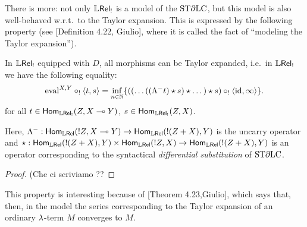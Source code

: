 There is more: not only $\mathbb{L} \mathsf{Rel}_!$ is a model of the $\mathrm{ST}\partial\mathrm{LC}$, but this model is also well-behaved w.r.t.\ to the \lamcalc Taylor expansion.
This is expressed by the following property (see [Definition 4.22, Giulio], where it is called the fact of ``modeling the Taylor expansion'').

\begin{theorem}\label{thm:modelsTaylor}
 In $\mathbb{L} \mathsf{Rel}_!$ equipped with $D$, all morphisms can be Taylor expanded, i.e.\ in $\mathbb{L} \mathsf{Rel}_!$ we have the following equality:
 \[
  \mathrm{eval}^{X,Y}\circ_!\langle t,s\rangle =
  \inf\limits_{n\in\mathbb{N}}
  \{((\dots((\Lambda^- t)\star s)\star \dots)\star s)\circ_! \langle \mathrm{id},\infty \rangle\}.
 \]
 for all $t\in\mathsf{Hom}_{\mathbb{L} \mathsf{Rel}_!}(Z,X\multimap Y)$, $s\in\mathsf{Hom}_{\mathbb{L} \mathsf{Rel}_!}(Z,X)$.
\end{theorem}
Here, $\Lambda^-:\mathsf{Hom}_{\mathbb{L} \mathsf{Rel}}(!Z,X\multimap Y)\to \mathsf{Hom}_{\mathbb{L} \mathsf{Rel}}(!(Z+X),Y)$ is the uncarry operator and $\star:\mathsf{Hom}_{\mathbb{L} \mathsf{Rel}}(!(Z+X),Y)\times\mathsf{Hom}_{\mathbb{L} \mathsf{Rel}}(!Z,X)\to \mathsf{Hom}_{\mathbb{L} \mathsf{Rel}}(!(Z+X),Y)$ is an operator corresponding to the syntactical \emph{differential substitution} of $\mathrm{ST}\partial\mathrm{LC}$.
\begin{proof}
 {\color{red}(Che ci scriviamo ??}
\end{proof}

This property is interesting because of [Theorem 4.23,Giulio], which says that, then, in the model the series corresponding to the Taylor expansion of an ordinary $\lambda$-term $M$ converges to $M$.
